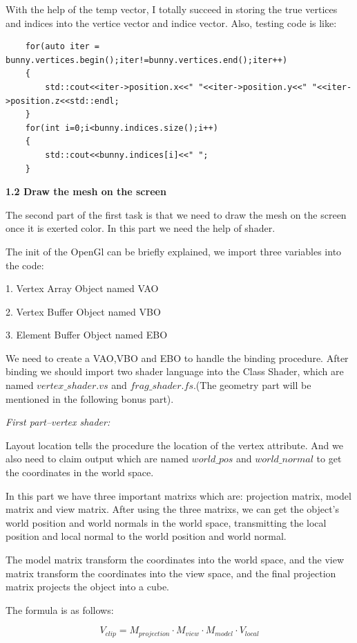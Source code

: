 \documentclass[acmtog]{acmart}
\begin{document}
With the help of the temp vector, I totally succeed in storing the true vertices and indices into the vertice vector and indice vector. Also, testing code is like:

\begin{lstlisting}
	for(auto iter = bunny.vertices.begin();iter!=bunny.vertices.end();iter++)
    {
    	std::cout<<iter->position.x<<" "<<iter->position.y<<" "<<iter->position.z<<std::endl;
    }
    for(int i=0;i<bunny.indices.size();i++)
	{
     	std::cout<<bunny.indices[i]<<" ";
  	}
\end{lstlisting}

\textbf{1.2 Draw the mesh on the screen}

The second part of the first task is that we need to draw the mesh on the screen once it is exerted color. In this part we need the help of shader.

The init of the OpenGl can be briefly explained, we import three variables into the code:

1. Vertex Array Object named VAO

2. Vertex Buffer Object named VBO

3. Element Buffer Object named EBO

We need to create a VAO,VBO and EBO to handle the binding procedure. After binding we should import two shader language into the Class Shader, which are named $vertex\_shader.vs$ and $frag\_shader.fs$.(The geometry part will be mentioned in the following bonus part).

\textcolor[rgb]{1,0,0}{\textit{First part--vertex shader:}}

Layout location tells the procedure the location of the vertex attribute. And we also need to claim output which are named $world\_pos$ and $world\_normal$ to get the coordinates in the world space.

In this part we have three important matrixs which are: projection matrix, model matrix and view matrix. After using the three matrixs, we can get the object's world position and world normals in the world space, transmitting the local position and local normal to the world position and world normal. 

The model matrix transform the coordinates into the world space, and the view matrix transform the coordinates into the view space, and the final projection matrix projects the object into a cube.

The formula is as follows:

$$V_{clip}=M_{projection}\cdot M_{view} \cdot M_{model} \cdot V_{local}$$ 
\end{document}
